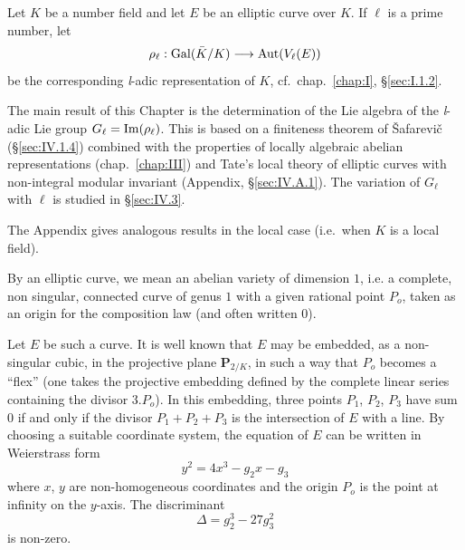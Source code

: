 
Let $K$ be a number field and let $E$ be an elliptic curve over $K$.
If $\ell$ is a prime number, let
\[
\rho_\ell : \mathrm{Gal}(\bar K/K) \longrightarrow \mathrm{Aut}(V_\ell(E))
\]
be the corresponding \textit{l}-adic representation of $K$,
cf.~chap.~\ref{chap:I}, \S\ref{sec:I.1.2}.

The main result of this Chapter is the determination of the Lie algebra
of the \textit{l}-adic Lie group $G_\ell = \mathrm{Im}(\rho_\ell)$.  This is
based on a finiteness theorem of \v{S}afarevi\v{c} (\S\ref{sec:IV.1.4})
combined with the properties of locally algebraic abelian
representations (chap.~\ref{chap:III}) and Tate's local theory of
elliptic curves with non-integral modular invariant
(Appendix, \S\ref{sec:IV.A.1}).  The variation of $G_\ell$ with $\ell$
is studied in \S\ref{sec:IV.3}.

The Appendix gives analogous results in the local case (i.e.\ when $K$
is a local field).



By an elliptic curve, we mean an abelian variety of dimension $1$,
i.e. a complete, non singular, connected curve of genus $1$ with a
given rational point $P_o$, taken as an origin for the composition law
(and often written $0$).

Let $E$ be such a curve.  It is well known that $E$ may be embedded, as
a non-singular cubic, in the projective plane $\mathbf{P}_{2/K}$, in
such a way that $P_o$ becomes a ``flex'' (one takes the projective
embedding defined by the complete linear series containing the divisor
$3.P_o$).  In this embedding, three points $P_1$, $P_2$, $P_3$ have sum
$0$ if and only if the divisor $P_1 + P_2 + P_3$ is the intersection of
$E$ with a line.  By choosing a suitable coordinate system, the
equation of $E$ can be written in Weierstrass form
\[
y^2 = 4x^3 - g_2x - g_3
\]
where $x$, $y$ are non-homogeneous coordinates and the origin $P_o$ is
the point at infinity on the $y$-axis.  The discriminant
\[
\Delta = g_2^3 - 27g_3^2
\]
is non-zero.

